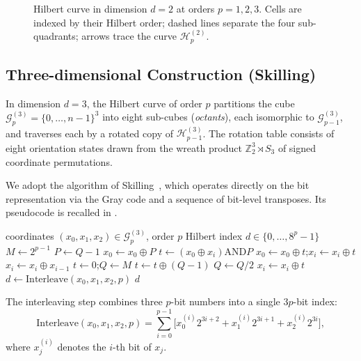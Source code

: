 \documentclass[11pt,a4paper]{article}
\theoremstyle{plain}
\theoremstyle{definition}
\theoremstyle{remark}
\newcommand{\Z}{\mathbb{Z}}
\newcommand{\Hil}{\mathcal{H}}
\newcommand{\Grid}{\mathcal{G}}
\begin{document}
\begin{figure}[!htbp]
  \centering
  
  \caption{Hilbert curve in dimension $d=2$ at orders $p=1,2,3$.
  Cells are indexed by their Hilbert order; dashed lines separate
  the four sub-quadrants; arrows trace the curve $\Hil_p^{(2)}$.}
  \label{fig:hilbert2d}
\end{figure}

\subsection{Three-dimensional Construction (Skilling)}\label{sec:hilbert_3d}

In dimension $d=3$, the Hilbert curve of order $p$ partitions the cube
$\Grid_p^{(3)} = \{0,\dots,n-1\}^3$ into eight sub-cubes (\emph{octants}),
each isomorphic to $\Grid_{p-1}^{(3)}$, and traverses each by a rotated
copy of $\Hil_{p-1}^{(3)}$. The rotation table consists of eight
orientation states drawn from the wreath product
$\Z_2^3\rtimes S_3$ of signed coordinate permutations.

We adopt the algorithm of Skilling~\cite{skilling2004}, which operates
directly on the bit representation via the Gray code and a sequence of
bit-level transposes. Its pseudocode is recalled in
.

\begin{algorithm}[H]
\caption{Skilling 3D: coordinates to Hilbert index}\label{alg:skilling_xyz2d}
\begin{algorithmic}[1]
\Require coordinates $(x_0,x_1,x_2)\in\Grid_p^{(3)}$, order $p$
\Ensure Hilbert index $d \in \{0,\dots,8^p-1\}$
\State $M \gets 2^{p-1}$
  \State $P \gets Q-1$
      \State $x_0 \gets x_0 \oplus P$
    \Else
      \State $t \gets (x_0 \oplus x_i) \mathbin{\mathrm{AND}} P$
      \State $x_0 \gets x_0 \oplus t$;\quad $x_i \gets x_i \oplus t$
    \EndIf
  \EndFor
\EndFor
{}
  \State $x_i \gets x_i \oplus x_{i-1}$
\EndFor
\State $t \gets 0$;\quad $Q \gets M$
    \State $t \gets t \oplus (Q-1)$
  \EndIf
  \State $Q \gets Q/2$
\EndWhile
{}
  \State $x_i \gets x_i \oplus t$
\EndFor
\State $d \gets \mathrm{Interleave}(x_0,x_1,x_2,p)$
\State \Return $d$
\end{algorithmic}
\end{algorithm}

The interleaving step combines three $p$-bit numbers into a single
$3p$-bit index:
\begin{equation}\label{eq:interleave}
\mathrm{Interleave}(x_0,x_1,x_2,p) = \sum_{i=0}^{p-1}
\bigl[ x_0^{(i)} 2^{3i+2} + x_1^{(i)} 2^{3i+1} + x_2^{(i)} 2^{3i} \bigr],
\end{equation}
where $x_j^{(i)}$ denotes the $i$-th bit of $x_j$.
\end{document}
